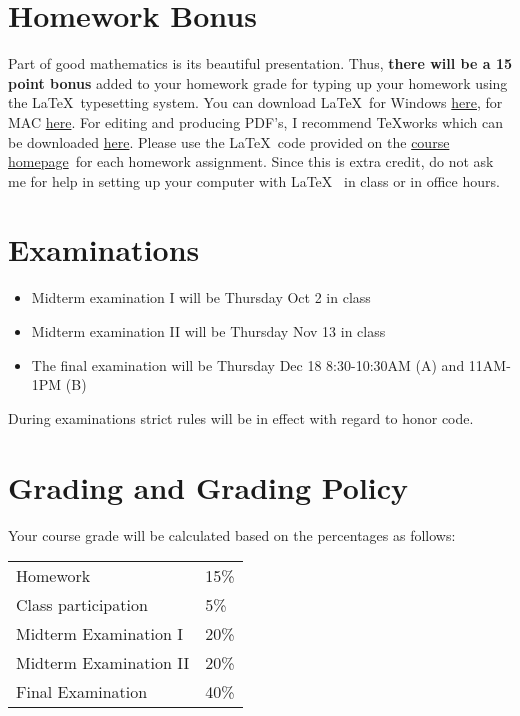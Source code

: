 \documentclass[12pt]{article}
\newcommand{\ingreen}[1]{\color{green}\textbf{#1} \color{black}}
\newcommand{\coursewebpage}{\href{https://github.com/kapelner/QC_Math_241_Fall_2014_15}{course homepage}}
\begin{document}
\section*{Homework Bonus}

Part of good mathematics is its beautiful presentation. Thus, \ingreen{there will be a 15 point bonus} added to your homework grade  for typing up your homework using the \LaTeX ~typesetting system. You can download \LaTeX ~for Windows \href{http://www.miktex.org/download}{here}, for MAC \href{http://www.tug.org/mactex/}{here}. For editing and producing PDF's, I recommend \TeX works which can be downloaded \href{http://www.tug.org/texworks/#Getting_TeXworks}{here}. Please use the \LaTeX ~code provided on the \coursewebpage ~for each homework assignment. Since this is extra credit, do not ask me for help in setting up your computer with \LaTeX~ in class or in office hours.

\section*{Examinations}

\begin{itemize}
\itemsep -0.0em 
\item Midterm examination I will be Thursday Oct 2 in class
\item Midterm examination II will be Thursday Nov 13 in class
\item The final examination will be Thursday Dec 18 8:30-10:30AM (A) and 11AM-1PM (B)
\end{itemize}

During examinations strict rules will be in effect with regard to honor code.

\section*{Grading and Grading Policy}

Your course grade will be calculated based on the percentages as follows: 

\begin{table}[htp]
\centering
\begin{tabular}{l|l}
Homework & 15\% \\
Class participation & 5\% \\
Midterm Examination I & 20\%\\
Midterm Examination II & 20\%\\
Final Examination & 40\%
\end{tabular}
\end{table}
\end{document}
